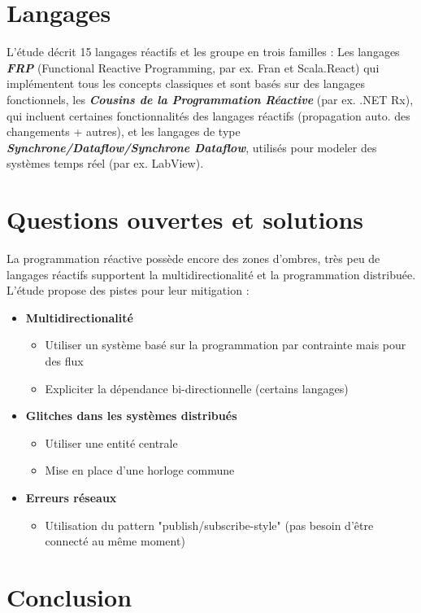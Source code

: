 \documentclass[10pt,final]{IEEEtran}
\begin{document}
\section{Langages}

L'étude décrit 15 langages réactifs et les groupe en trois familles : Les langages \textit{\textbf{FRP}} (Functional Reactive Programming, par ex. Fran et Scala.React) qui implémentent tous les concepts classiques et sont basés sur des langages fonctionnels, les \textit{\textbf{Cousins de la Programmation Réactive}} (par ex. .NET Rx), qui incluent certaines fonctionnalités des langages réactifs (propagation auto. des changements + autres), et les langages de type \textit{\textbf{Synchrone/Dataflow/Synchrone Dataflow}}, utilisés pour modeler des systèmes temps réel (par ex. LabView). 

\section{Questions ouvertes et solutions}

La programmation réactive possède encore des zones d'ombres, très peu de langages réactifs
supportent la multidirectionalité et la programmation distribuée. L'étude propose des pistes pour leur mitigation :
\begin{itemize}
    \item \textbf{Multidirectionalité}
        \begin{itemize}
            \item Utiliser un système basé sur la programmation par contrainte mais pour des flux
            \item Expliciter la dépendance bi-directionnelle (certains langages)
        \end{itemize}
    \item \textbf{Glitches dans les systèmes distribués}
        \begin{itemize}
            \item Utiliser une entité centrale
            \item Mise en place d'une horloge commune
        \end{itemize}
    \item \textbf{Erreurs réseaux}
        \begin{itemize}
            \item Utilisation du pattern "publish/subscribe-style" (pas besoin d'être connecté au même moment)
        \end{itemize}
\end{itemize}

\section{Conclusion}
\end{document}
